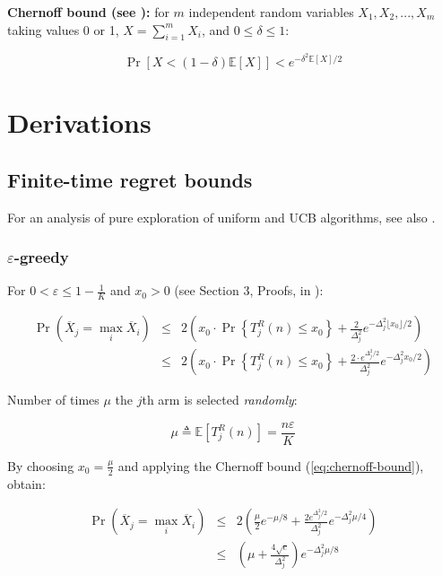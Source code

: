 \documentclass{article}
\newcommand {\IE} {\ensuremath {\mathbb{E}}}
\begin{document}
{\bf Chernoff bound (see \cite{Hagerup.chernoff}):} for $m$ independent random variables $X_1, X_2, ..., X_m$
taking values 0 or 1, $X=\sum_{i=1}^m X_i$, and $0\le\delta\le 1$:

\begin{equation}
\label{eq:chernoff-bound}
\Pr[X < (1-\delta)\IE[X]] < e^{-\delta^2\IE[X]/2}
\end{equation}

\section{Derivations}

\subsection{Finite-time regret bounds}

For an analysis of pure exploration of uniform and UCB algorithms, see also
\cite{Bubeck.pure}.


\subsubsection{$\varepsilon$-greedy}

For $0<\varepsilon\le1-\frac 1 K$ and $x_0>0$ (see Section 3, Proofs, in \cite{Auer.ucb}):

\begin{eqnarray}
\Pr(\overline X_j=\max_i\overline X_i)&\le&2\left(x_0\cdot \Pr\left\{T_j^R(n)\le x_0\right\} + \frac 2{\Delta_j^2}e^{-\Delta_j^2\lfloor x_0 \rfloor/2}\right)\nonumber\\
&\le&2\left(x_0\cdot \Pr\left\{T_j^R(n)\le x_0\right\} + \frac {2 \cdot
  e^{\Delta_j^2/2}}{\Delta_j^2}e^{-\Delta_j^2 x_0 /2}\right)
\end{eqnarray}

Number of times $\mu$ the $j$th arm is selected {\it randomly}:

\begin{equation}
\mu\triangleq\IE\left[T_j^R(n)\right]=\frac {n\varepsilon} K
\end{equation}

By choosing $x_0=\frac \mu 2$ and applying the Chernoff bound (\ref{eq:chernoff-bound}), obtain:

\begin{eqnarray}
\label{eq:pr-epsilon-greedy}
\Pr(\overline X_j=\max_i\overline X_i)&\le& 2\left(\frac {\mu}{2} e^{-\mu/8} + \frac {2e^{\Delta_j^2/2}}{\Delta_j^2}e^{-\Delta_j^2 \mu/4}\right)\nonumber\\
&\le&\left(\mu + \frac {4\sqrt e}{\Delta_j^2}\right)e^{-\Delta_j^2\mu/8}
\end{eqnarray}
\end{document}
